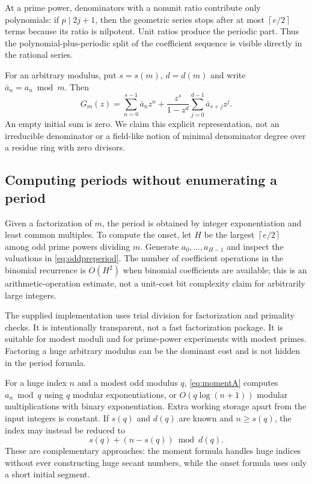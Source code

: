 \documentclass[11pt,a4paper]{article}
\numberwithin{equation}{section}
\theoremstyle{definition}
\newcommand{\ceil}[1]{\left\lceil #1\right\rceil}
\begin{document}
At a prime power, denominators with a nonunit ratio contribute only
polynomials: if $p\mid2j+1$, then the geometric series stops after at
most $\ceil{e/2}$ terms because its ratio is nilpotent. Unit ratios
produce the periodic part. Thus the polynomial-plus-periodic split of
the coefficient sequence is visible directly in the rational series.

For an arbitrary modulus, put $s=s(m)$, $d=d(m)$ and write
$\bar a_n=a_n\bmod m$. Then
\begin{equation}\label{eq:generalGF}
G_m(z)=\sum_{n=0}^{s-1}\bar a_nz^n
 +\frac{z^s}{1-z^d}\sum_{j=0}^{d-1}\bar a_{s+j}z^j.
\end{equation}
An empty initial sum is zero. We claim this explicit representation, not
an irreducible denominator or a field-like notion of minimal denominator
degree over a residue ring with zero divisors.

\subsection{Computing periods without enumerating a period}

Given a factorization of $m$, the period is obtained by integer
exponentiation and least common multiples. To compute the onset, let
$H$ be the largest $\ceil{e/2}$ among odd prime powers dividing $m$.
Generate $a_0,\ldots,a_{H-1}$ and inspect the valuations in
\eqref{eq:oddpreperiod}. The number of coefficient operations in the
binomial recurrence is $O(H^2)$ when binomial coefficients are available;
this is an arithmetic-operation estimate, not a unit-cost bit complexity
claim for arbitrarily large integers.

The supplied implementation uses trial division for factorization and
primality checks. It is intentionally transparent, not a fast
factorization package. It is suitable for modest moduli and for
prime-power experiments with modest primes. Factoring a huge arbitrary
modulus can be the dominant cost and is not hidden in the period formula.

For a huge index $n$ and a modest odd modulus $q$,
\eqref{eq:momentA} computes $a_n\bmod q$ using $q$ modular
exponentiations, or $O(q\log(n+1))$ modular multiplications with binary
exponentiation. Extra working storage apart from the input integers is
constant. If $s(q)$ and $d(q)$ are known and $n\ge s(q)$, the index may
instead be reduced to
\[
s(q)+(n-s(q))\bmod d(q).
\]
These are complementary approaches: the moment formula handles huge
indices without ever constructing huge secant numbers, while the onset
formula uses only a short initial segment.
\end{document}

